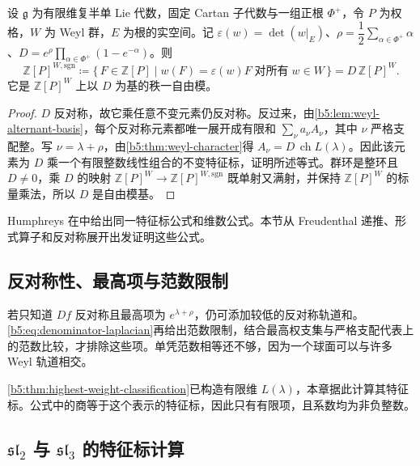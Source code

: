 \begin{corollary}[反对称子模]\label{b5:cor:weyl-anti-invariant-module}
	设 \(\mathfrak g\) 为有限维复半单 Lie 代数，固定 Cartan 子代数与一组正根 \(\Phi^+\)，令 \(P\) 为权格，\(W\) 为 Weyl 群，\(E\) 为根的实空间。记 \(\varepsilon(w)=\det(w|_E)\)、\(\rho=\dfrac12\sum_{\alpha\in\Phi^+}\alpha\)、\(D=e^\rho\prod_{\alpha\in\Phi^+}(1-e^{-\alpha})\)。则
	\[
		\mathbb Z[P]^{W,\mathrm{sgn}} \coloneqq\{\,F\in\mathbb Z[P]\mid w(F)=\varepsilon(w)F\;\text{对所有}\;w\in W\,\} =D\,\mathbb Z[P]^W.
	\]
	它是 \(\mathbb Z[P]^W\) 上以 \(D\) 为基的秩一自由模。
\end{corollary}
\begin{proof}
	\(D\) 反对称，故它乘任意不变元素仍反对称。反过来，由\cref{b5:lem:weyl-alternant-basis}，每个反对称元素都唯一展开成有限和 \(\sum_\nu a_\nu A_\nu\)，其中 \(\nu\) 严格支配整。写 \(\nu=\lambda+\rho\)，由\cref{b5:thm:weyl-character}得 \(A_\nu=D\,\operatorname{ch}L(\lambda)\)。因此该元素为 \(D\) 乘一个有限整数线性组合的不变特征标，证明所述等式。群环是整环且 \(D\ne0\)，乘 \(D\) 的映射 \(\mathbb Z[P]^W\rightarrow\mathbb Z[P]^{W,\mathrm{sgn}}\) 既单射又满射，并保持 \(\mathbb Z[P]^W\) 的标量乘法，所以 \(D\) 是自由模基。
\end{proof}

Humphreys 在\cite[Section 24.3, pp. 138--139]{Humphreys1972LieAlgebras}中给出同一特征标公式和维数公式。本节从 Freudenthal 递推、形式算子和反对称展开出发证明这些公式。

\subsection{反对称性、最高项与范数限制}
\label{b5:subsec:1904:03}

若只知道 \(Df\) 反对称且最高项为 \(e^{\lambda+\rho}\)，仍可添加较低的反对称轨道和。\eqref{b5:eq:denominator-laplacian}再给出范数限制，结合最高权支集与严格支配代表上的范数比较，才排除这些项。单凭范数相等还不够，因为一个球面可以与许多 Weyl 轨道相交。

\ProseParagraphBreak

\cref{b5:thm:highest-weight-classification}已构造有限维 \(L(\lambda)\)，本章据此计算其特征标。公式中的商等于这个表示的特征标，因此只有有限项，且系数均为非负整数。

\subsection{\texorpdfstring{\(\mathfrak{sl}_2\) 与 \(\mathfrak{sl}_3\) 的特征标计算}{sl2 与 sl3 的特征标计算}}
\label{b5:subsec:1904:04}

